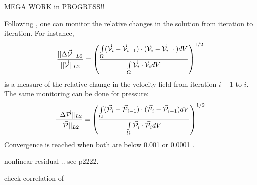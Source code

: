 
MEGA WORK in PROGRESS!!

Following \cite{spmw16}, one can monitor the relative changes in the solution from iteration to iteration. 
For instance, 
\[
\frac{||\Delta \vec{\cal V} ||_{L2}}{||\vec{\cal V}||_{L2}} 
=
\left( \frac{\int\limits_\Omega (\vec{\cal V}_i-\vec{\cal V}_{i-1}) \cdot( \vec{\cal V}_i-\vec{\cal V}_{i-1}) dV}{\int\limits_\Omega \vec{\cal V}_i\cdot\vec{\cal V}_i dV} \right)^{1/2}
\]
is a measure of the relative change in the velocity field from iteration $i-1$ to $i$. 
The same monitoring can be done for pressure:
\[
\frac{||\Delta \vec{\cal P} ||_{L2}}{||\vec{\cal P}||_{L2}} 
=
\left( \frac{\int\limits_\Omega (\vec{\cal P}_i-\vec{\cal P}_{i-1}) \cdot( \vec{\cal P}_i-\vec{\cal P}_{i-1}) dV}{\int\limits_\Omega \vec{\cal P}_i\cdot\vec{\cal P}_i dV} \right)^{1/2}
\]
Convergence is reached when both are below 0.001 \cite{lemm08} or 0.0001 \cite{kaus10}.




nonlinear residual .. see \cite{spmw16} p2222. 

check correlation of \cite{thie11}



